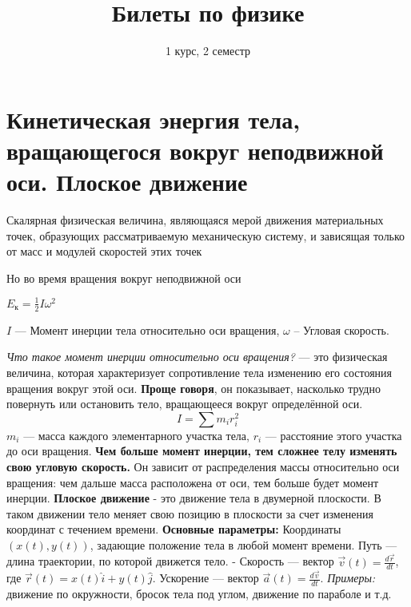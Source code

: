 \documentclass[14pt]{article}
\title{Билеты по физике}
\author{1 курс, 2 семестр}
\begin{document}
    \maketitle





    \section{Кинетическая энергия тела, вращающегося вокруг неподвижной оси. Плоское движение}
    Скалярная физическая величина, являющаяся мерой движения материальных точек, образующих рассматриваемую механическую систему, и зависящая только от масс и модулей скоростей этих точек
    \newline
    \begin{center}
        \big[$E_k = \frac{mv^2}{2}$] 
    \end{center}
    Но во время вращения вокруг неподвижной оси
    \begin{center}
        $E_{к} = \frac{1}{2} I \omega^2$
    \end{center}
    $I$ — Момент инерции тела относительно оси вращения,
    $\omega$ -- Угловая скорость.

    \textit{Что такое момент инерции относительно оси вращения?}
    \newline — это физическая величина, которая характеризует сопротивление тела изменению его состояния вращения вокруг этой оси. 
    \newline \textbf{Проще говоря}, он показывает, насколько трудно повернуть или остановить тело, вращающееся вокруг определённой оси. 
    \[ I = \sum m_i r_i^2 \]  
    \( m_i \) — масса каждого элементарного участка тела,
    \( r_i \) — расстояние этого участка до оси вращения. 
    \textbf{Чем больше момент инерции, тем сложнее телу изменять свою угловую скорость.} 
    Он зависит от распределения массы относительно оси вращения: чем дальше масса расположена от оси, тем больше будет момент инерции.
    \textbf{Плоское движение} - это движение тела в двумерной плоскости. В таком движении тело меняет свою позицию в плоскости за счет изменения координат с течением времени. 
    \newline \textbf{Основные параметры:} 
    \newline Координаты \((x(t), y(t))\), задающие положение тела в любой момент времени. 
    \newline Путь — длина траектории, по которой движется тело. -
    \newline Скорость — вектор \(\vec{v}(t) = \frac{d\vec{r}}{dt}\), где \(\vec{r}(t) = x(t)\hat{i} + y(t)\hat{j}\). 
    \newline Ускорение — вектор \(\vec{a}(t) = \frac{d\vec{v}}{dt}\). 
    \newline \textit{ Примеры:} движение по окружности, бросок тела под углом, движение по параболе и т.д.
\end{document}
